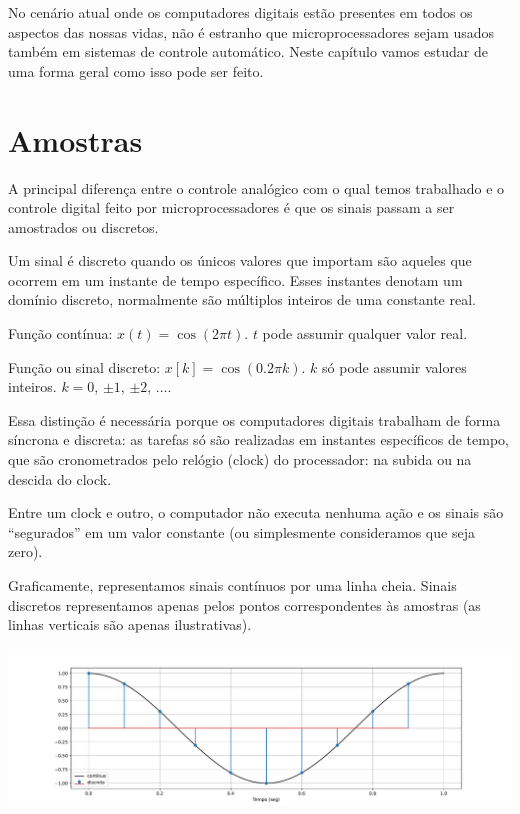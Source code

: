 \documentclass[
]{book}
\begin{document}
No cenário atual onde os computadores digitais estão presentes em todos os aspectos das nossas vidas, não é estranho que microprocessadores sejam usados também em sistemas de controle automático. Neste capítulo vamos estudar de uma forma geral como isso pode ser feito.

\hypertarget{amostras}{%
\section{Amostras}\label{amostras}}

A principal diferença entre o controle analógico com o qual temos trabalhado e o controle digital feito por microprocessadores é que os sinais passam a ser amostrados ou discretos.

Um sinal é discreto quando os únicos valores que importam são aqueles que ocorrem em um instante de tempo específico. Esses instantes denotam um domínio discreto, normalmente são múltiplos inteiros de uma constante real.

Função contínua: \(x(t)=\cos (2\pi t)\). \(t\) pode assumir qualquer valor real.

Função ou sinal discreto: \(x[k] = \cos(0.2\pi k )\). \(k\) só pode assumir valores inteiros. \(k=0\), \(\pm 1\), \(\pm 2\), \(\ldots\).

Essa distinção é necessária porque os computadores digitais trabalham de forma síncrona e discreta: as tarefas só são realizadas em instantes específicos de tempo, que são cronometrados pelo relógio (clock) do processador: na subida ou na descida do clock.

Entre um clock e outro, o computador não executa nenhuma ação e os sinais são ``segurados'' em um valor constante (ou simplesmente consideramos que seja zero).

Graficamente, representamos sinais contínuos por uma linha cheia. Sinais discretos representamos apenas pelos pontos correspondentes às amostras (as linhas verticais são apenas ilustrativas).

\begin{center}\includegraphics{_main_files/figure-latex/unnamed-chunk-50-1} \end{center}
\end{document}
